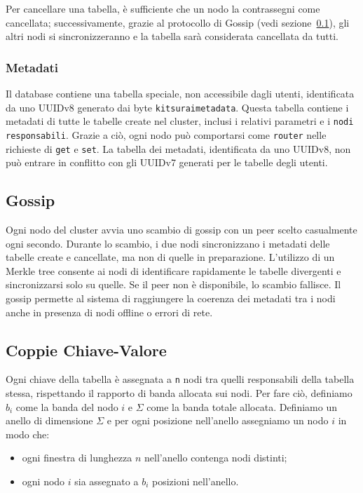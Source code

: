 Per cancellare una tabella, è sufficiente che un nodo la contrassegni come cancellata; successivamente, grazie al protocollo di Gossip (vedi sezione~\ref{subsec:gossip}), gli altri nodi si sincronizzeranno e la tabella sarà considerata cancellata da tutti.

\subsubsection{Metadati}
\label{subsubsec:metadati}

Il database contiene una tabella speciale, non accessibile dagli utenti, identificata da uno UUIDv8 generato dai byte \texttt{kitsuraimetadata}.
Questa tabella contiene i metadati di tutte le tabelle create nel cluster, inclusi i relativi parametri e i \texttt{nodi responsabili}.
Grazie a ciò, ogni nodo può comportarsi come \texttt{router} nelle richieste di \texttt{get} e \texttt{set}.
La tabella dei metadati, identificata da uno UUIDv8, non può entrare in conflitto con gli UUIDv7 generati per le tabelle degli utenti.

\subsection{Gossip}
\label{subsec:gossip}

Ogni nodo del cluster avvia uno scambio di gossip con un peer scelto casualmente ogni secondo.
Durante lo scambio, i due nodi sincronizzano i metadati delle tabelle create e cancellate, ma non di quelle in preparazione.
L'utilizzo di un Merkle tree consente ai nodi di identificare rapidamente le tabelle divergenti e sincronizzarsi solo su quelle.
Se il peer non è disponibile, lo scambio fallisce.
Il gossip permette al sistema di raggiungere la coerenza dei metadati tra i nodi anche in presenza di nodi offline o errori di rete.

\subsection{Coppie Chiave-Valore}
\label{subsec:coppie-chiave-valore}

Ogni chiave della tabella è assegnata a \texttt{n} nodi tra quelli responsabili della tabella stessa, rispettando il rapporto di banda allocata sui nodi.
Per fare ciò, definiamo $b_i$ come la banda del nodo $i$ e $\Sigma$ come la banda totale allocata.
Definiamo un anello di dimensione $\Sigma$ e per ogni posizione nell'anello assegniamo un nodo $i$ in modo che:
\begin{itemize}
    \item ogni finestra di lunghezza $n$ nell'anello contenga nodi distinti;
    \item ogni nodo $i$ sia assegnato a $b_i$ posizioni nell'anello.
\end{itemize}

